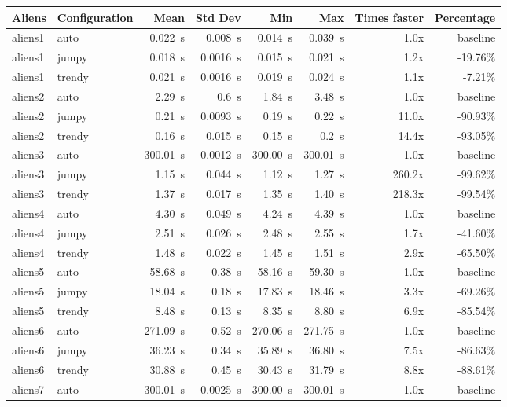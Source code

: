 \documentclass[11pt]{article}
\begin{document}
\begin{table}[h]
  \centering
  \begin{tabular}{|llrrrrrr|}
    \hline
    Aliens & Configuration & Mean & Std Dev & Min & Max & Times faster & Percentage \\
    \hline
    aliens1 & auto & 0.022~s & 0.008~s & 0.014~s & 0.039~s & 1.0x & baseline \\
    aliens1 & jumpy & 0.018~s & 0.0016~s & 0.015~s & 0.021~s & 1.2x & -19.76\% \\
    aliens1 & trendy & 0.021~s & 0.0016~s & 0.019~s & 0.024~s & 1.1x & -7.21\% \\
    \hline
    aliens2 & auto & 2.29~s & 0.6~s & 1.84~s & 3.48~s & 1.0x & baseline \\
    aliens2 & jumpy & 0.21~s & 0.0093~s & 0.19~s & 0.22~s & 11.0x & -90.93\% \\
    aliens2 & trendy & 0.16~s & 0.015~s & 0.15~s & 0.2~s & 14.4x & -93.05\% \\
    \hline
    aliens3 & auto & 300.01~s & 0.0012~s & 300.00~s & 300.01~s & 1.0x & baseline \\
    aliens3 & jumpy & 1.15~s & 0.044~s & 1.12~s & 1.27~s & 260.2x & -99.62\% \\
    aliens3 & trendy & 1.37~s & 0.017~s & 1.35~s & 1.40~s & 218.3x & -99.54\% \\
    \hline
    aliens4 & auto & 4.30~s & 0.049~s & 4.24~s & 4.39~s & 1.0x & baseline \\
    aliens4 & jumpy & 2.51~s & 0.026~s & 2.48~s & 2.55~s & 1.7x & -41.60\% \\
    aliens4 & trendy & 1.48~s & 0.022~s & 1.45~s & 1.51~s & 2.9x & -65.50\% \\
    \hline
    aliens5 & auto & 58.68~s & 0.38~s & 58.16~s & 59.30~s & 1.0x & baseline \\
    aliens5 & jumpy & 18.04~s & 0.18~s & 17.83~s & 18.46~s & 3.3x & -69.26\% \\
    aliens5 & trendy & 8.48~s & 0.13~s & 8.35~s & 8.80~s & 6.9x & -85.54\% \\
    \hline
    aliens6 & auto & 271.09~s & 0.52~s & 270.06~s & 271.75~s & 1.0x & baseline \\
    aliens6 & jumpy & 36.23~s & 0.34~s & 35.89~s & 36.80~s & 7.5x & -86.63\% \\
    aliens6 & trendy & 30.88~s & 0.45~s & 30.43~s & 31.79~s & 8.8x & -88.61\% \\
    \hline
    aliens7 & auto & 300.01~s & 0.0025~s & 300.00~s & 300.01~s & 1.0x & baseline \\

\end{tabular}
\end{table}
\end{document}
